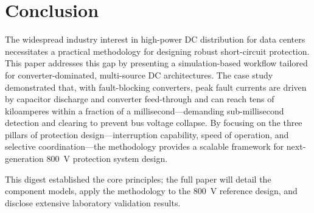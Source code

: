 \documentclass[conference]{IEEEtran}
\begin{document}
\section{Conclusion}

The widespread industry interest in high-power DC distribution for data centers necessitates a practical methodology for designing robust short-circuit protection. This paper addresses this gap by presenting a simulation-based workflow tailored for converter-dominated, multi-source DC architectures. The case study demonstrated that, with fault-blocking converters, peak fault currents are driven by capacitor discharge and converter feed-through and can reach tens of kiloamperes within a fraction of a millisecond---demanding sub-millisecond detection and clearing to prevent bus voltage collapse. By focusing on the three pillars of protection design---interruption capability, speed of operation, and selective coordination---the methodology provides a scalable framework for next-generation 800~V protection system design.

This digest established the core principles; the full paper will detail the component models, apply the methodology to the 800~V reference design, and disclose extensive laboratory validation results.




\end{document}
